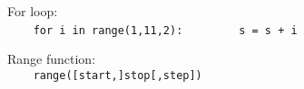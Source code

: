 For loop:\\
{\ex \lstinline|    for i in range(1,11,2):|}
{\ex \lstinline|        s = s + i|}

Range function:\\
{\ex \lstinline|    range([start,]stop[,step])|}
